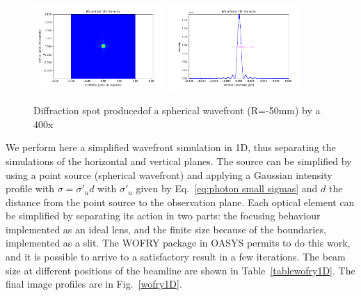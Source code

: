 \documentclass{iucr}              %
\begin{document}
\begin{figure}
\label{wofry400um}
\centering
\includegraphics[width=0.45\textwidth]{GRAPHICS/wofry400umslit.png}
\includegraphics[width=0.45\textwidth]{GRAPHICS/wofry400umprofile.png}
\caption{Diffraction spot producedof a spherical wavefront (R=-50mm) by a 400x}
\end{figure}

We perform here a simplified wavefront simulation in 1D, thus separating the simulations of the horizontal and vertical planes. The source can be simplified by using a point source (spherical wavefront) and applying a Gaussian intensity profile with $\sigma=\sigma'_u d$ with $\sigma'_u$ given by Eq.~\ref{eq:photon small sigmas} and $d$ the distance from the point source to the observation plane. Each optical element can be simplified by separating its action in two parts: the focusing behaviour implemented as an ideal lens, and the finite size because of the boundaries, implemented as a slit. The WOFRY package in OASYS permits to do this work, and it is possible to arrive to a satisfactory result in a few iterations. The beam size at different positions of the beamline are shown in Table~\ref{tablewofry1D}. The final image profiles are in Fig.~\ref{wofry1D}.
\end{document}
